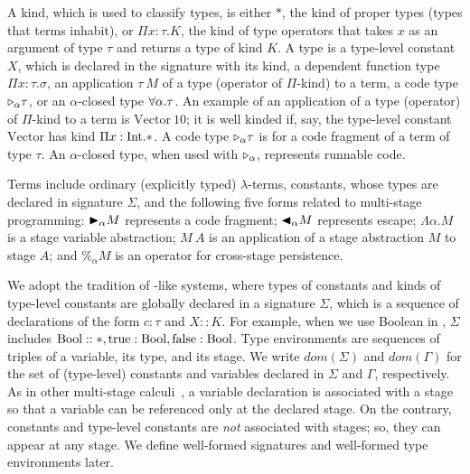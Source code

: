 


A kind, which is used to classify types, is either $*$, the kind of
proper types (types that terms inhabit), or $\Pi x\colon\tau.K$, the kind
of type operators that takes $x$ as an argument of type $\tau$ and returns a type
of kind $K$.
A type is a type-level constant $X$, which is declared in the signature with its kind, a dependent function type $\Pi x:\tau.\sigma$,
an application $\tau\ M$ of a type (operator of $\Pi$-kind) to a term, a code type ${\mathop{\triangleright}}_\alpha \tau$, or an $\alpha$-closed type $\forall\alpha.\tau$.
An example of an application of a type (operator) of $\Pi$-kind to a term is $\text{Vector}\ 10$; it is well kinded
if, say, the type-level constant $\text{Vector}$ has kind $\Pi x:\textrm{Int}.*$.
A code type ${\mathop{\triangleright}}_\alpha \tau$ is for a code fragment of a term of type $\tau$.
An $\alpha$-closed type, when used with ${\mathop{\triangleright}}_\alpha$, represents runnable code.



Terms include ordinary (explicitly typed) \(\lambda\)-terms, constants,
whose types are declared in signature $\Sigma$, and the following five forms
related to multi-stage programming:
${\mathop{\blacktriangleright}}_\alpha M$ represents a code fragment; ${\mathop{\blacktriangleleft}}_\alpha M$ represents escape;
$\Lambda\alpha.M$ is a stage variable abstraction;
$M\ A$ is an application of a stage abstraction $M$ to stage $A$; and
$\%_\alpha M$ is an operator for cross-stage persistence.


We adopt the tradition of \LLF-like systems, where types of constants and
kinds of type-level constants are globally declared in a signature $\Sigma$,
which is a sequence of declarations of the form $c:\tau$ and $X::K$. For
example, when we use Boolean in \LMD, $\Sigma$ includes $\textrm{Bool} :: *,
\textrm{true}:\textrm{Bool}, \textrm{false}:\textrm{Bool}$. Type environments are sequences of
triples of a variable, its type, and its stage. We write
\(\textit{dom}(\Sigma)\) and \(\textit{dom}(\Gamma)\) for the set of
(type-level) constants and variables declared in \(\Sigma\) and \(\Gamma\),
respectively. As in other multi-stage
calculi~\cite{taha2003environment,Tsukada,Hanada2014}, a variable declaration
is associated with a stage so that a variable can be referenced only at the
declared stage. On the contrary, constants and type-level constants are
\emph{not} associated with stages; so, they can appear at any stage. We
define well-formed signatures and well-formed type environments later.

